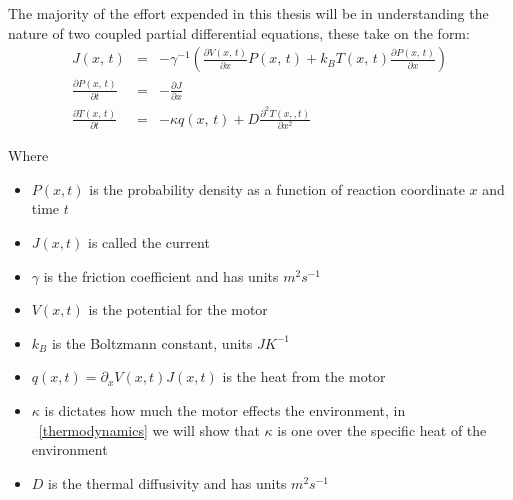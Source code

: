 
The majority of the effort expended in this thesis will be in understanding the nature of two coupled partial differential equations, these take on the form:
\begin{eqnarray}
J(x, \, t) &=& -\gamma^{-1} \left ( \frac{\partial V(x, \, t)}{\partial x} P(x, \, t) + k_B T(x, \, t) \frac{\partial P(x, \, t)}{\partial x} \right ) \label{eqn:current} \\
\frac{\partial P(x, \, t)}{\partial t} &=& -\frac{\partial J}{\partial x} \label{eqn:Smoluchowski} \\
\frac{\partial T(x, \, t)}{\partial t} &=& -\kappa q(x, \, t) + D \frac{\partial^2 T(x, 
, t)}{\partial x^2} \label{eqn:TemperatureEvolution}
\end{eqnarray}

Where
\begin{itemize}
\item{$P(x, t)$ is the probability density as a function of  reaction coordinate $x$ and time $t$}
\item{$J(x, t)$ is called the current}
\item{$\gamma$ is the friction coefficient and has units $m^2 s^{-1}$}
\item{$V(x, t)$ is the potential for the motor}
\item{$k_B$ is the Boltzmann constant, units $J K^{-1}$}
\item{$q(x, t) = \partial_x V(x, t) J(x, t)$ is the heat from the motor \cite{M.W.Jack2016}}
\item{$\kappa$ is dictates how much the motor effects the environment, in ~\autoref{thermodynamics} we will show that $\kappa$ is one over the specific heat of the environment}
\item{$D$ is the thermal diffusivity and has units $m^2 s^{-1}$}
\end{itemize}

